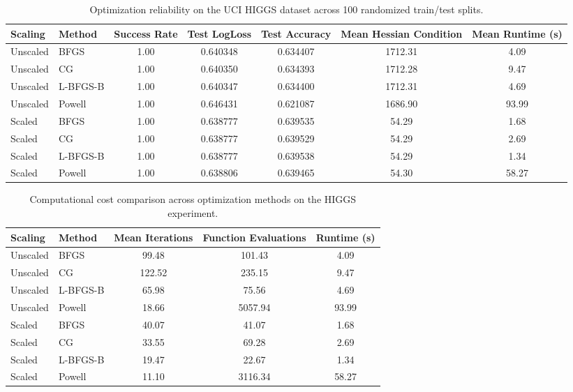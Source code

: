 \begin{table}
\centering
\small
\begin{tabular}{llccccc}
\hline
\textbf{Scaling} &
\textbf{Method} &
\textbf{Success Rate} &
\textbf{Test LogLoss} &
\textbf{Test Accuracy} &
\textbf{Mean Hessian Condition} &
\textbf{Mean Runtime (s)} \\
\hline
Unscaled & BFGS & 1.00 & 0.640348 & 0.634407 & 1712.31 & 4.09 \\
Unscaled & CG & 1.00 & 0.640350 & 0.634393 & 1712.28 & 9.47 \\
Unscaled & L-BFGS-B & 1.00 & 0.640347 & 0.634400 & 1712.31 & 4.69 \\
Unscaled & Powell & 1.00 & 0.646431 & 0.621087 & 1686.90 & 93.99 \\
Scaled & BFGS & 1.00 & 0.638777 & 0.639535 & 54.29 & 1.68 \\
Scaled & CG & 1.00 & 0.638777 & 0.639529 & 54.29 & 2.69 \\
Scaled & L-BFGS-B & 1.00 & 0.638777 & 0.639538 & 54.29 & 1.34 \\
Scaled & Powell & 1.00 & 0.638806 & 0.639465 & 54.30 & 58.27 \\
\hline
\end{tabular}

\caption{Optimization reliability on the UCI HIGGS dataset across 100 randomized train/test splits.}
\label{tab:higgs_results}
\end{table}

\begin{table}
\centering
\begin{tabular}{llccc}
\hline
\textbf{Scaling} &
\textbf{Method} &
\textbf{Mean Iterations} &
\textbf{Function Evaluations} &
\textbf{Runtime (s)} \\
\hline
Unscaled & BFGS & 99.48 & 101.43 & 4.09 \\
Unscaled & CG & 122.52 & 235.15 & 9.47 \\
Unscaled & L-BFGS-B & 65.98 & 75.56 & 4.69 \\
Unscaled & Powell & 18.66 & 5057.94 & 93.99 \\
Scaled & BFGS & 40.07 & 41.07 & 1.68 \\
Scaled & CG & 33.55 & 69.28 & 2.69 \\
Scaled & L-BFGS-B & 19.47 & 22.67 & 1.34 \\
Scaled & Powell & 11.10 & 3116.34 & 58.27 \\
\hline
\end{tabular}
\caption{Computational cost comparison across optimization methods on the HIGGS experiment.}
\label{tab:higgs_cost}
\end{table}

